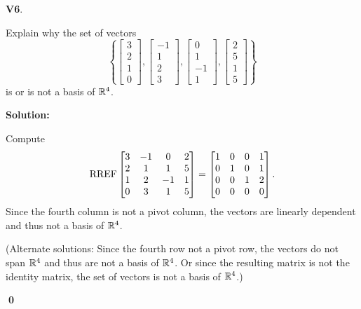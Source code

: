 \documentclass{article}
\newenvironment{problem}[1]
{
  \begin{flushleft}
  \textbf{#1}.
  \ignorespaces
}
{
  \end{flushleft}
}
\newenvironment{solution}
{
  \ignorespaces
  \textbf{Solution:}
}
{
  \ignorespacesafterend
  \begin{flushright}
  {\bfseries \qed}
  \end{flushright}
}
\begin{document}
\begin{problem}{V6}
Explain why the set of vectors \[ \left\{
 \begin{bmatrix} 3 \\ 2 \\ 1 \\ 0 \end{bmatrix} ,
 \begin{bmatrix} -1 \\ 1 \\ 2 \\ 3 \end{bmatrix} ,
 \begin{bmatrix} 0 \\ 1 \\ -1 \\ 1 \end{bmatrix} ,
 \begin{bmatrix} 2 \\ 5 \\ 1 \\ 5 \end{bmatrix} \right\} \]
is or is not a basis of \(\mathbb{R}^4\).
\end{problem}
\begin{solution}
Compute
\[\operatorname{RREF} \begin{bmatrix} 3 & -1 & 0 & 2 \\ 2 & 1 & 1 & 5 \\ 1 & 2 & -1 & 1 \\ 0 & 3 & 1 & 5 \end{bmatrix} =
\begin{bmatrix} 1 & 0 & 0 & 1 \\ 0 & 1 & 0 & 1 \\ 0 & 0 & 1 & 2 \\ 0 & 0 & 0 & 0 \end{bmatrix}.\]
Since the fourth column is not a pivot column, the vectors are linearly
dependent and thus not a basis of \(\mathbb{R}^4\).

(Alternate solutions:
Since the fourth row not a pivot row, the vectors do not span
\(\mathbb{R}^4\) and thus are not a basis of \(\mathbb{R}^4\). Or since the resulting matrix is not
the identity matrix, the set of vectors is not a basis of \(\mathbb{R}^4\).)
\end{solution}
\end{document}
